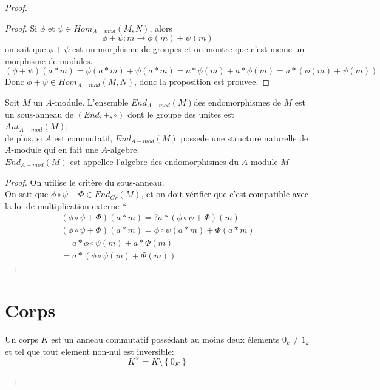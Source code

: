 \documentclass[../main.tex]{subfiles}
\begin{document}
\begin{proof}
\begin{proof}
	Si $\phi$ et $\psi \in Hom _{A-mod} ( M,N)$, alors
	\[ 
		\phi + \psi : m \to \phi(m) + \psi(m)
	\]
	on sait que $\phi+ \psi$ est un morphisme de groupes et on montre que c'est meme un morphisme de modules.\\
	\[ 
		( \phi+ \psi)(a \ast m) = \phi(a \ast m) + \psi(a \ast m) = a \ast \phi(m) + a \ast \phi(m) = a \ast( \phi(m) + \psi(m))
	\]
	Donc $\phi + \psi \in Hom _{A-mod} ( M,N)$, donc la proposition est prouvee.
\end{proof}
\begin{thm}
	Soit $M$ un $A$-module. L'ensemble $End _{A-mod} ( M)$des endomorphismes de $M$ est un sous-anneau de $ ( End, + , \circ)$ dont le groupe des unites est\\
	$Aut_{A-mod} ( M)$;\\
	de plus, si $A$ est commutatif, $End _{A-mod} ( M)$ possede une structure naturelle de $A$-module qui en fait une $A$-algebre.\\
	$End _{A-mod} ( M)$ est appellee l'algebre des endomorphismes du $A$-module $M$
\end{thm}
\begin{proof}
	On utilise le critère du sous-anneau.\\
	On sait que $\phi \circ \psi + \Phi \in End_{Gr} ( M)$, et on doit vérifier que c'est compatible avec la loi de multiplication externe $\ast$
	\begin{align*}
	( \phi \circ \psi + \Phi)(a \ast m) =? a \ast ( \phi \circ \psi + \Phi)(m)\\
	( \phi \circ \psi + \Phi)(a \ast m) = \phi \circ \psi ( a \ast m) + \Phi ( a \ast m)\\
	= a \ast \phi \circ \psi(m) + a \ast \Phi(m)\\
	= a \ast ( \phi \circ \psi(m) + \Phi(m))
	\end{align*}
	
\end{proof}
	
\section{Corps}
\begin{defn}[Corps]\label{defn:corps}
	Un corps $K$ est un anneau commutatif possédant au moins deux éléments $0_k \neq 1_k$ et tel que tout element non-nul est inversible:
	\[ 
	K^{\times} = K \setminus  \left\{ 0_K \right\} 
	\]
	
\end{defn}


\end{proof}
\end{document}
